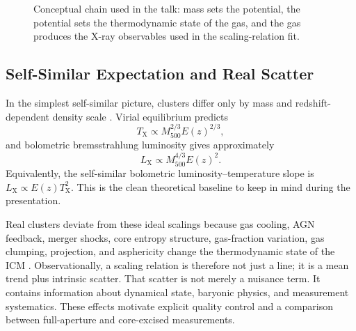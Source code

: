 \documentclass[11pt]{article}
\newcommand{\Mfive}{\ensuremath{M_{500}}}
\newcommand{\Lx}{\ensuremath{L_{\mathrm{X}}}}
\newcommand{\Tx}{\ensuremath{T_{\mathrm{X}}}}
\begin{document}
\begin{figure}[t]
  \centering
  \caption{Conceptual chain used in the talk: mass sets the potential, the potential sets the thermodynamic state of the gas, and the gas produces the X-ray observables used in the scaling-relation fit.}
  \label{fig:physical-chain}
\end{figure}

\subsection{Self-Similar Expectation and Real Scatter}

In the simplest self-similar picture, clusters differ only by mass and redshift-dependent density scale \citep{kaiser1986,arnaud2005}. Virial equilibrium predicts
\begin{equation}
  T_{\mathrm{X}} \propto M_{500}^{2/3} E(z)^{2/3},
\end{equation}
and bolometric bremsstrahlung luminosity gives approximately
\begin{equation}
  L_{\mathrm{X}} \propto M_{500}^{4/3} E(z)^2.
\end{equation}
Equivalently, the self-similar bolometric luminosity--temperature slope is $L_{\mathrm{X}}\propto E(z)T_{\mathrm{X}}^2$. This is the clean theoretical baseline to keep in mind during the presentation.

Real clusters deviate from these ideal scalings because gas cooling, AGN feedback, merger shocks, core entropy structure, gas-fraction variation, gas clumping, projection, and asphericity change the thermodynamic state of the ICM \citep{pratt2009,mantz2010,maughan2012}. Observationally, a scaling relation is therefore not just a line; it is a mean trend plus intrinsic scatter. That scatter is not merely a nuisance term. It contains information about dynamical state, baryonic physics, and measurement systematics. These effects motivate explicit quality control and a comparison between full-aperture and core-excised measurements.
\end{document}
